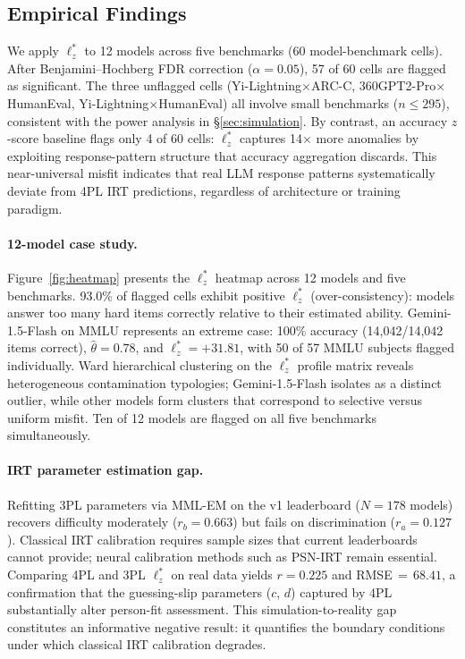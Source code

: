 \subsection{Empirical Findings}
\label{sec:empirical}

We apply $\ell_z^*$ to 12 models across five benchmarks (60 model-benchmark cells).
After Benjamini--Hochberg FDR correction ($\alpha=0.05$), 57 of 60 cells are flagged as significant.
The three unflagged cells (Yi-Lightning$\times$ARC-C, 360GPT2-Pro$\times$HumanEval, Yi-Lightning$\times$HumanEval) all involve small benchmarks ($n \leq 295$), consistent with the power analysis in \S\ref{sec:simulation}.
By contrast, an accuracy $z$-score baseline flags only 4 of 60 cells: $\ell_z^*$ captures 14$\times$ more anomalies by exploiting response-pattern structure that accuracy aggregation discards.
This near-universal misfit indicates that real LLM response patterns systematically deviate from 4PL IRT predictions, regardless of architecture or training paradigm.

\paragraph{12-model case study.}
Figure~\ref{fig:heatmap} presents the $\ell_z^*$ heatmap across 12 models and five benchmarks.
93.0\% of flagged cells exhibit positive $\ell_z^*$ (over-consistency): models answer too many hard items correctly relative to their estimated ability.
Gemini-1.5-Flash on MMLU represents an extreme case: 100\% accuracy (14{,}042/14{,}042 items correct), $\hat{\theta}=0.78$, and $\ell_z^*{=}{+}31.81$, with 50 of 57 MMLU subjects flagged individually.
Ward hierarchical clustering on the $\ell_z^*$ profile matrix reveals heterogeneous contamination typologies; Gemini-1.5-Flash isolates as a distinct outlier, while other models form clusters that correspond to selective versus uniform misfit.
Ten of 12 models are flagged on all five benchmarks simultaneously.

\paragraph{IRT parameter estimation gap.}
Refitting 3PL parameters via MML-EM on the v1 leaderboard ($N{=}178$ models) recovers difficulty moderately ($r_b = 0.663$) but fails on discrimination ($r_a = 0.127$).
Classical IRT calibration requires sample sizes that current leaderboards cannot provide; neural calibration methods such as PSN-IRT \citep{psnirt2026} remain essential.
Comparing 4PL and 3PL $\ell_z^*$ on real data yields $r=0.225$ and RMSE$\,{=}\,68.41$, a confirmation that the guessing-slip parameters ($c$, $d$) captured by 4PL substantially alter person-fit assessment.
This simulation-to-reality gap constitutes an informative negative result: it quantifies the boundary conditions under which classical IRT calibration degrades.

